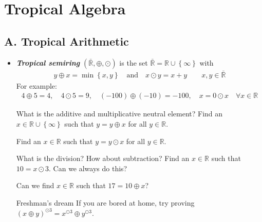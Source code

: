 \documentclass{article}
\begin{document}
\section*{Tropical Algebra}

\subsection*{A. Tropical Arithmetic}

\begin{itemize}
	\item \textbf{\emph{Tropical semiring}} \( (\bar{\mathbb{R}}, \oplus, \odot) \) is the set \( \bar{\mathbb{R}} = \mathbb{R} \cup \left\{  \infty \right\}\) with 
	\begin{gather*}
		y \oplus x = \min\left\{ x,y \right\} \quad \text{and} \quad x \odot y = x + y \qquad x,y \in \bar{\mathbb{R}} 
	\end{gather*}
	For example:
		\begin{align*}
			4 \oplus 5 = 4, \quad4 \odot 5 = 9, \quad (-100) \oplus (-10) = -100, \quad x= 0 \odot x \quad \forall x \in \mathbb{R}
		\end{align*}

		\begin{exercise}{What is the additive and multiplicative neutral element?}{}
		Find an \( x \in \mathbb{R} \cup \left\{ \infty \right\} \) such that \( y = y \oplus x \) for all \( y \in \mathbb{R} \).

		Find an \( x \in \mathbb{R} \) such that \( y = y \odot x \) for all \( y \in \mathbb{R} \).
		\end{exercise}
	
		\begin{exercise}{What is the division? How about subtraction?}{}
		Find an \( x \in \mathbb{R} \) such that \( 10 = x \odot 3 \). Can we always do this?
		
		Can we find \( x \in \mathbb{R} \) such that \( 17 = 10 \oplus x \)?
		\end{exercise}

		\begin{exercise}{Freshman's dream}{}
		If you are bored at home, try proving \( (x \oplus y)^{\odot 3} = x^{\odot 3} \oplus y^{\odot 3} \).
		\end{exercise}


\end{itemize}
\end{document}
